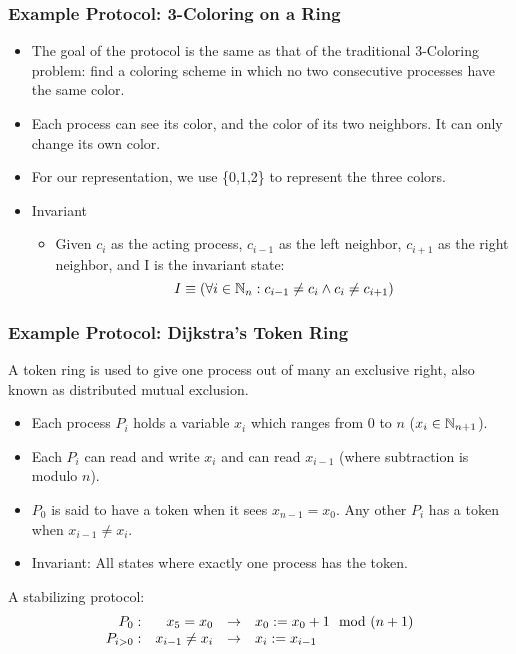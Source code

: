 \documentclass[handout]{beamer}
\begin{document}
\begin{frame}
\frametitle{Example Protocol: 3-Coloring on a Ring}
\begin{itemize}
\item The goal of the protocol is the same as that of the traditional 3-Coloring problem: find a 
    coloring scheme in which no two consecutive processes have the same color.
\item Each process can see its color, and the color of its two neighbors.  It can only change its
    own color.
\item For our representation, we use \{0,1,2\} to represent the three colors.
\item Invariant
 \begin{itemize}
 \item Given $c_i$ as the acting process, $c_{i-1}$ as the left neighbor, $c_{i+1}$ as the right
    neighbor, and I is the invariant state: 
    \[ I \equiv (\forall i\in\mathbb{N}_n: c_{i-1}\ne c_i \wedge c_i \ne c_{i+1}) \]
 \end{itemize}
\end{itemize}
\end{frame}

\begin{frame}
\frametitle{Example Protocol: Dijkstra's Token Ring \cite{dij}}
A token ring is used to give one process out of many an exclusive right, also   known as distributed mutual exclusion.
\begin{figure}
\end{figure}
\end{frame}

\begin{frame}
\begin{itemize}
\item Each process $P_i$ holds a variable $x_i$ which ranges from $0$ to $n$ ($x_i\in\mathbb{N}_{n+1}$). 
\item Each $P_i$ can read and write $x_i$ and can read $x_{i-1}$ (where subtraction   is modulo $n$). 
\item $P_0$ is said to have a token when it sees $x_{n-1} = x_0$. Any other $P_i$ has a token when $x_{i-1} \neq x_i$. 
\item Invariant: All states where exactly one process has the token.
\end{itemize}
A stabilizing protocol:
\[ 
      \begin{array}{rrcl} 
         P_0: & x_{5} = x_0 & \to & x_0 := x_0 + 1 \mod (n+1) 
  \\ P_{i>0}: & x_{i-1} \neq x_i & \to & x_i := x_{i-1} 
      \end{array} 
\] 
\end{frame}
\end{document}
